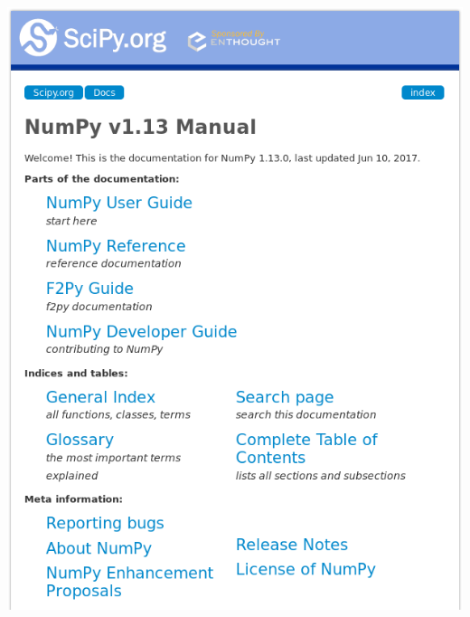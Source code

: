 \documentclass[svgnames]{beamer}
\begin{document}
\begin{frame}
\begin{columns}
\begin{column}[t]{0.5\textwidth}
\begin{center}
    \vspace{0.3truecm}
    \includegraphics[width=\textwidth]{NumpyManual}
   \end{center}
  \end{column}
 \end{columns}
\end{frame}
\end{document}
